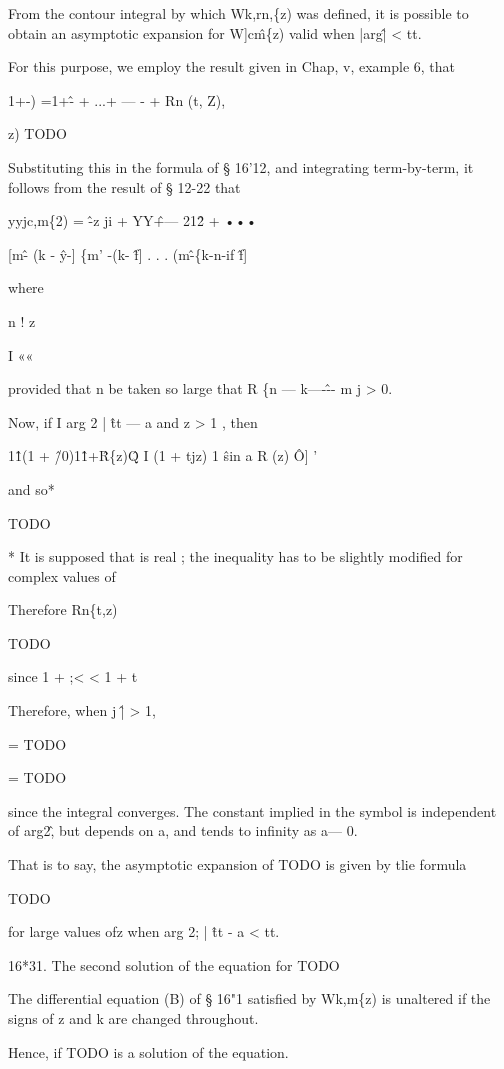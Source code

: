 From the contour integral by which Wk,rn,\{z) was defined, it is
possible to obtain an asymptotic expansion for W]c\^m\{z) valid when
|arg\^| < tt.

For this purpose, we employ the result given in Chap, v, example 6,
that

1+-) =1+\^- + ...+ — - + Rn (t, Z),

z) TODO

Substituting this in the formula of § 16'12, and integrating
term-by-term, it follows from the result of § 12-22 that

yyjc,m\{2) = \^ -z ji + YY\^ +— 21\^2 + •••

[m\^ - (k - \^y-] \{m' -(k- \^f] . . . (m\^ -\{k-n-if \^f]

where

n ! z

I ««

provided that n be taken so large that R \{n — k—-\^-- m j > 0.

Now, if I arg 2 | \^ tt — a and z > 1 , then

1\^1(1 + \^/0)1\^1+\^ R\{z)\^Q I (1 + tjz) 1 \^ sin a R (z) \^ O] '

and so*

TODO

* It is supposed that is real ; the inequality has to be slightly
modified for complex values of

%
%

Therefore Rn\{t,z)

TODO

since 1 + ;< < 1 + t

Therefore, when j \^ | > 1,

= TODO

= TODO

since the integral converges. The constant implied in the symbol is
independent of arg2\^, but depends on a, and tends to infinity as a—
0.

That is to say, the asymptotic expansion of TODO is given by tlie
formula

TODO

for large values ofz when arg 2; | \^ tt - a < tt.

16*31. The second solution of the equation for TODO

The differential equation (B) of § 16"1 satisfied by Wk,m\{z) is
unaltered if the signs of z and k are changed throughout.

Hence, if TODO is a solution of the equation.

